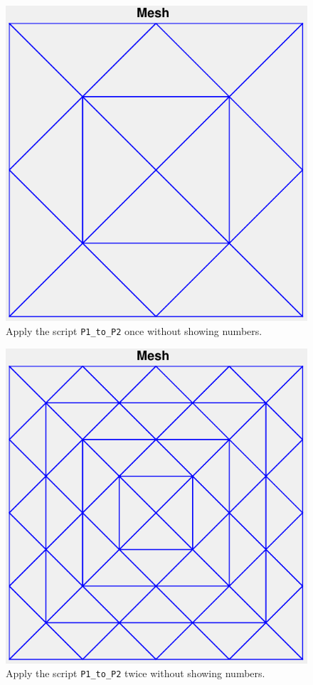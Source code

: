 \documentclass[11pt,a4paper,center,notitlepage]{article}
\numberwithin{equation}{section}
\begin{document}
\begin{figure}[H]
\centering
\includegraphics[scale=0.6]{2}
\caption{Apply the script \texttt{P1\_to\_P2} once without showing numbers.}
\label{fig2}
\end{figure}

\begin{figure}[H]
\centering
\includegraphics[scale=0.6]{3}
\caption{Apply the script \texttt{P1\_to\_P2} twice without showing numbers.}
\label{fig3}
\end{figure}
\end{document}
